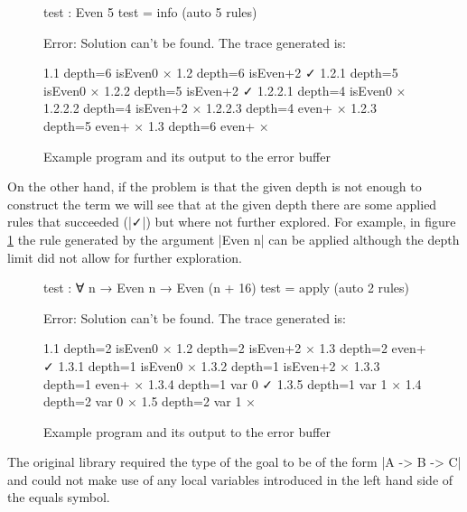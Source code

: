 \documentclass[a4paper]{article}
\begin{document}
\begin{figure}[h]
\noindent\begin{minipage}{.40\textwidth}
\scriptsize
\begin{code}
  test : Even 5
  test = info (auto 5 rules)
\end{code}
\end{minipage}
\begin{minipage}{.55\textwidth}
\scriptsize
\begin{code}
Error: Solution can't be found. The trace generated is:

1.1 depth=6 isEven0 ×
1.2 depth=6 isEven+2 ✓
1.2.1 depth=5 isEven0 ×
1.2.2 depth=5 isEven+2 ✓
1.2.2.1 depth=4 isEven0 ×
1.2.2.2 depth=4 isEven+2 ×
1.2.2.3 depth=4 even+ ×
1.2.3 depth=5 even+ ×
1.3 depth=6 even+ ×
\end{code}
\end{minipage}
  \caption{Example program and its output to the error buffer}
\end{figure}

On the other hand, if the problem is that the given depth is not enough to
construct the term we will see that at the given depth there are some applied
rules that succeeded (|✓|) but where not further explored. For example, in
figure \ref{fig:depth} the rule generated by the argument |Even n| can be
applied although the depth limit did not allow for further exploration.

\begin{figure}
\noindent\begin{minipage}{.40\textwidth}
\scriptsize
\begin{code}
  test : ∀ {n} → Even n → Even (n + 16)
  test = apply (auto 2 rules)
\end{code}
\end{minipage}
\begin{minipage}{.55\textwidth}
\scriptsize
\begin{code}
Error: Solution can't be found. The trace generated is:

1.1 depth=2 isEven0 ×
1.2 depth=2 isEven+2 ×
1.3 depth=2 even+ ✓
1.3.1 depth=1 isEven0 ×
1.3.2 depth=1 isEven+2 ×
1.3.3 depth=1 even+ ×
1.3.4 depth=1 var 0 ✓
1.3.5 depth=1 var 1 ×
1.4 depth=2 var 0 ×
1.5 depth=2 var 1 ×
\end{code}
\end{minipage}
  \caption{Example program and its output to the error buffer}
  \label{fig:depth}
\end{figure}

The original library required the type of the goal to be of the form |A -> B ->
C| and could not make use of any local variables introduced in the left hand
side of the equals symbol.
\end{document}
